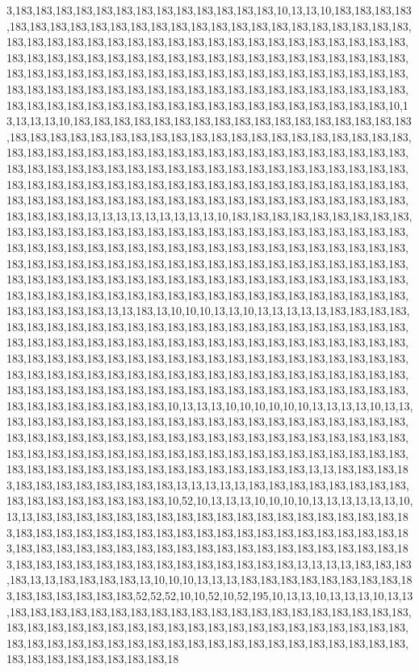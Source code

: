 3,183,183,183,183,183,183,183,183,183,183,183,183,183,10,13,13,10,183,183,183,183,183,183,183,183,183,183,183,183,183,183,183,183,183,183,183,183,183,183,183,183,183,183,183,183,183,183,183,183,183,183,183,183,183,183,183,183,183,183,183,183,183,183,183,183,183,183,183,183,183,183,183,183,183,183,183,183,183,183,183,183,183,183,183,183,183,183,183,183,183,183,183,183,183,183,183,183,183,183,183,183,183,183,183,183,183,183,183,183,183,183,183,183,183,183,183,183,183,183,183,183,183,183,183,183,183,183,183,183,183,183,183,183,183,183,183,183,183,183,183,10,13,13,13,13,10,183,183,183,183,183,183,183,183,183,183,183,183,183,183,183,183,183,183,183,183,183,183,183,183,183,183,183,183,183,183,183,183,183,183,183,183,183,183,183,183,183,183,183,183,183,183,183,183,183,183,183,183,183,183,183,183,183,183,183,183,183,183,183,183,183,183,183,183,183,183,183,183,183,183,183,183,183,183,183,183,183,183,183,183,183,183,183,183,183,183,183,183,183,183,183,183,183,183,183,183,183,183,183,183,183,183,183,183,183,183,183,183,183,183,183,183,183,183,183,183,183,13,13,13,13,13,13,13,13,13,10,183,183,183,183,183,183,183,183,183,183,183,183,183,183,183,183,183,183,183,183,183,183,183,183,183,183,183,183,183,183,183,183,183,183,183,183,183,183,183,183,183,183,183,183,183,183,183,183,183,183,183,183,183,183,183,183,183,183,183,183,183,183,183,183,183,183,183,183,183,183,183,183,183,183,183,183,183,183,183,183,183,183,183,183,183,183,183,183,183,183,183,183,183,183,183,183,183,183,183,183,183,183,183,183,183,183,183,183,183,183,183,183,183,183,13,13,183,13,10,10,10,13,13,10,13,13,13,13,13,183,183,183,183,183,183,183,183,183,183,183,183,183,183,183,183,183,183,183,183,183,183,183,183,183,183,183,183,183,183,183,183,183,183,183,183,183,183,183,183,183,183,183,183,183,183,183,183,183,183,183,183,183,183,183,183,183,183,183,183,183,183,183,183,183,183,183,183,183,183,183,183,183,183,183,183,183,183,183,183,183,183,183,183,183,183,183,183,183,183,183,183,183,183,183,183,183,183,183,183,183,183,183,183,183,183,183,183,183,183,183,183,10,13,13,13,10,10,10,10,10,10,13,13,13,13,10,13,13,183,183,183,183,183,183,183,183,183,183,183,183,183,183,183,183,183,183,183,183,183,183,183,183,183,183,183,183,183,183,183,183,183,183,183,183,183,183,183,183,183,183,183,183,183,183,183,183,183,183,183,183,183,183,183,183,183,183,183,183,183,183,183,183,183,183,183,183,183,183,183,183,183,183,183,13,13,183,183,183,183,183,183,183,183,183,183,183,183,13,13,13,13,13,183,183,183,183,183,183,183,183,183,183,183,183,183,183,183,183,10,52,10,13,13,13,10,10,10,10,13,13,13,13,13,13,10,13,13,183,183,183,183,183,183,183,183,183,183,183,183,183,183,183,183,183,183,183,183,183,183,183,183,183,183,183,183,183,183,183,183,183,183,183,183,183,183,183,183,183,183,183,183,183,183,183,183,183,183,183,183,183,183,183,183,183,183,183,183,183,183,183,183,183,183,183,183,183,183,183,183,183,13,13,13,13,183,183,183,183,13,13,183,183,183,183,13,10,10,10,13,13,13,183,183,183,183,183,183,183,183,183,183,183,183,183,183,183,52,52,52,10,10,52,10,52,195,10,13,13,10,13,13,13,10,13,13,183,183,183,183,183,183,183,183,183,183,183,183,183,183,183,183,183,183,183,183,183,183,183,183,183,183,183,183,183,183,183,183,183,183,183,183,183,183,183,183,183,183,183,183,183,183,183,183,183,183,183,183,183,183,183,183,183,183,183,183,183,183,183,183,183,183,183,183,18